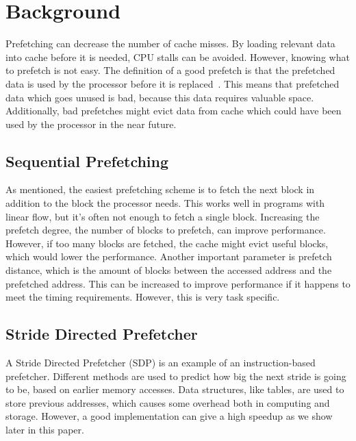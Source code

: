 \section{Background} %



Prefetching can decrease the number of cache misses. By loading
relevant data into cache before it is needed, CPU stalls can be
avoided. However, knowing what to prefetch is not easy. The definition
of a good prefetch is that the prefetched data is used by the
processor before it is
replaced~\cite{srinivasan_davidson_tyson_2004}. This means that
prefetched data which goes unused is bad, because this data requires
valuable space. Additionally, bad prefetches might evict data from
cache which could have been used by the processor in the near future.

\subsection{Sequential Prefetching}

As mentioned, the easiest prefetching scheme is to fetch the next
block in addition to the block the processor needs. This works well in
programs with linear flow, but it's often not enough to fetch a single
block. Increasing the prefetch degree, the number of blocks to
prefetch, can improve performance. However, if too many blocks are
fetched, the cache might evict useful blocks, which would lower the
performance. Another important parameter is prefetch distance, which
is the amount of blocks between the accessed address and the
prefetched address. This can be increased to improve performance if it
happens to meet the timing requirements. However, this is very task
specific.

\subsection{Stride Directed Prefetcher}

A Stride Directed Prefetcher (SDP) is an example of an instruction-based
prefetcher. Different methods are used to predict how big the next
stride is going to be, based on earlier memory accesses. Data
structures, like tables, are used to store previous addresses, which
causes some overhead both in computing and storage. However, a good
implementation can give a high speedup as we show later in this paper.

